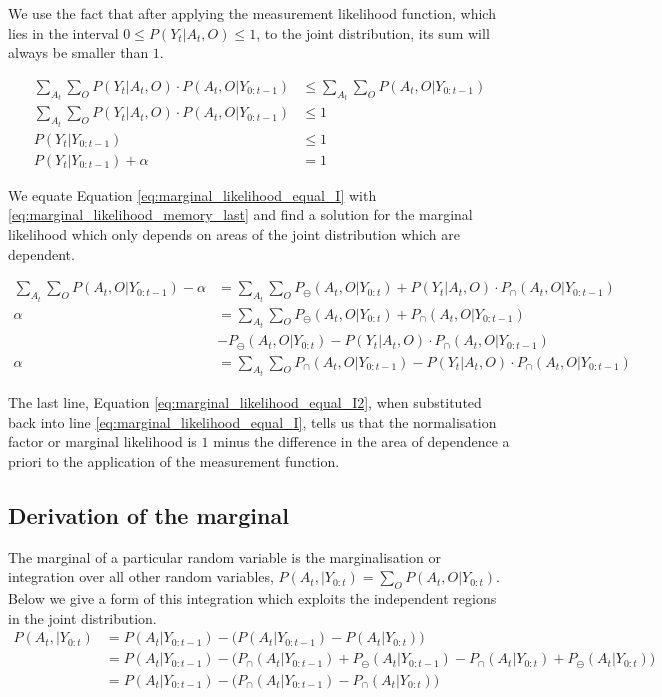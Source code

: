 We use the fact that after applying the measurement likelihood function, which lies in the interval $0 \leq P(Y_t|A_t,O) \leq 1$, 
to the joint distribution, its sum will always be smaller than $1$.

\begin{align}
  \sum\limits_{A_t}\sum\limits_{O} P(Y_t|A_t,O) \cdot P(A_t,O|Y_{0:t-1})  &\leq \sum\limits_{A_t}\sum\limits_{O} P(A_t,O|Y_{0:t-1}) \\
  \sum\limits_{A_t}\sum\limits_{O} P(Y_t|A_t,O) \cdot P(A_t,O|Y_{0:t-1}) &\leq 1 \\
  P(Y_t|Y_{0:t-1}) &\leq 1 \\
  P(Y_t|Y_{0:t-1}) + \alpha &= 1 \label{eq:marginal_likelihood_equal_I}
\end{align}

We equate Equation \ref{eq:marginal_likelihood_equal_I} with \ref{eq:marginal_likelihood_memory_last} and find a solution for the marginal likelihood which
only depends on areas of the joint distribution which are dependent.
		   
\begin{align}		  
 \sum\limits_{A_t}\sum\limits_{O} P(A_t,O|Y_{0:t-1}) - \alpha  &= \sum\limits_{A_t}\sum\limits_{O} P_{\ominus}(A_t,O|Y_{0:t}) + P(Y_t|A_t,O)\cdot P_{\cap}(A_t,O|Y_{0:t-1}) \\
   \alpha &= \sum\limits_{A_t}\sum\limits_{O}  P_{\ominus}(A_t,O|Y_{0:t}) + P_{\cap}(A_t,O|Y_{0:t-1})\\
     & - P_{\ominus}(A_t,O|Y_{0:t}) - P(Y_t|A_t,O)\cdot P_{\cap}(A_t,O|Y_{0:t-1}) \\
    \alpha &= \sum\limits_{A_t}\sum\limits_{O} P_{\cap}(A_t,O|Y_{0:t-1}) - P(Y_t|A_t,O)\cdot P_{\cap}(A_t,O|Y_{0:t-1}) \label{eq:marginal_likelihood_equal_I2}
\end{align}

The last line, Equation \ref{eq:marginal_likelihood_equal_I2}, when substituted back into line \ref{eq:marginal_likelihood_equal_I}, tells us that the normalisation factor or marginal likelihood is $1$ minus the difference in the area of
dependence a priori to the application of the measurement function.

\subsection{Derivation of the marginal}\label{appendix:marginal}

The marginal of a particular random variable is the marginalisation or integration over all other random variables, $P(A_t,|Y_{0:t}) = \sum\limits_{O} P(A_t,O|Y_{0:t})$. Below 
we give a form of this integration which exploits the independent regions in the joint distribution.
\begin{align}
 P(A_t,|Y_{0:t}) &= P(A_t|Y_{0:t-1}) - \Big(P(A_t|Y_{0:t-1}) - P(A_t|Y_{0:t}) \Big)  \\ 
		  &=  P(A_t|Y_{0:t-1}) - \Big(P_{\cap}(A_t|Y_{0:t-1}) + P_{\ominus}(A_t|Y_{0:t-1}) -  P_{\cap}(A_t|Y_{0:t}) + P_{\ominus}(A_t|Y_{0:t})   \Big) \label{eq:dependence1} \\
		  &=  P(A_t|Y_{0:t-1}) - \Big(P_{\cap}(A_t|Y_{0:t-1}) -  P_{\cap}(A_t|Y_{0:t})  \Big) \label{eq:dependence2} 
\end{align}


